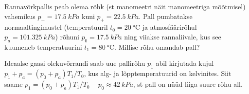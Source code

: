 
Rannavõrkpallis peab olema rõhk (st manomeetri näit manomeetriga mõõtmisel) vahemikus $p_-=\SI{17.5}{kPa}$ kuni $p_+=\SI{22.5}{kPa}$. Pall pumbatakse normaaltingimustel (temperatuuril $t_0=\SI{20}{\celsius}$ ja atmosfäärirõhul $p_a=\SI{101.325}{kPa}$) rõhuni $p_0=\SI{17.5}{kPa}$ ning viiakse rannaliivale, kus see kuumeneb temperatuurini $t_1=\SI{80}{\celsius}$. Millise rõhu omandab pall?


\hint

\solu
Ideaalse gaasi olekuvõrrandi saab uue pallirõhu $p_1$ abil kirjutada kujul $p_1+p_a=(p_0+p_a)T_1/T_0$, kus alg- ja lõpptemperatuurid on kelvinites. Siit saame $p_1=(p_0+p_a)T_1/T_0-p_0\approx \SI{42}{kPa}$, st pall on nüüd liiga suure rõhu all.
\probend